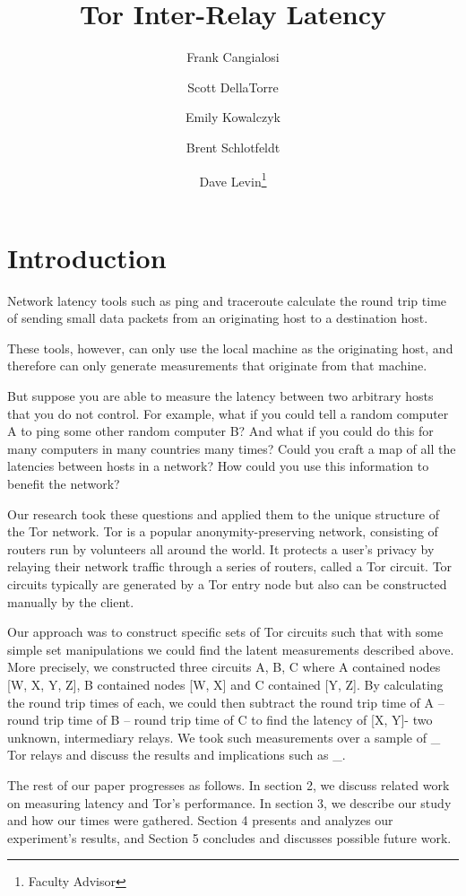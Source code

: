 \documentclass[twocolumn,11pt]{article}
\title{Tor Inter-Relay Latency}
\author[1]{Frank Cangialosi}
\author[1]{Scott DellaTorre}
\author[1]{Emily Kowalczyk}
\author[1]{Brent Schlotfeldt}
\author[1]{Dave Levin\thanks{Faculty Advisor}}
\affil[1]{University of Maryland}
\date{}
\begin{document}
\maketitle

\section {Introduction}

Network latency tools such as ping and traceroute calculate the round trip time of sending small data packets from an originating host to a destination host.

These tools, however, can only use the local machine as the originating host, and  therefore can only generate measurements that originate from that machine.

But suppose you are able to measure the latency between two arbitrary hosts that you do not control.  For example, what if you could tell a random computer A to ping some other random computer B?  And what if you could do this for many computers in many countries many times?  Could you craft a map of all the latencies between hosts in a network? How could you use this information to benefit the network?

Our research took these questions and applied them to the unique structure of the Tor network.  Tor is a popular anonymity-preserving network, consisting of routers run by volunteers all around the world.  It protects a user’s privacy by relaying their network traffic through a series of routers, called a Tor circuit.  Tor circuits typically are generated by a Tor entry node but also can be constructed manually by the client.

Our approach was to construct specific sets of Tor circuits such that with some simple set manipulations we could find the latent measurements described above. More precisely, we constructed three circuits A, B, C where A contained nodes [W, X, Y, Z], B contained nodes [W, X] and C contained [Y, Z].  By calculating the round trip times of each, we could then subtract the round trip time of A – round trip time of B – round trip time of C to find the latency of [X, Y]- two unknown, intermediary relays.  We took such measurements over a sample of \_ Tor relays and discuss the results and implications such as \_.

The rest of our paper progresses as follows.  In section 2, we discuss related work on measuring latency and Tor’s performance.  In section 3, we describe our study and how our times were gathered.  Section 4 presents and analyzes our experiment’s results, and Section 5 concludes and discusses possible future work.
\end{document}
